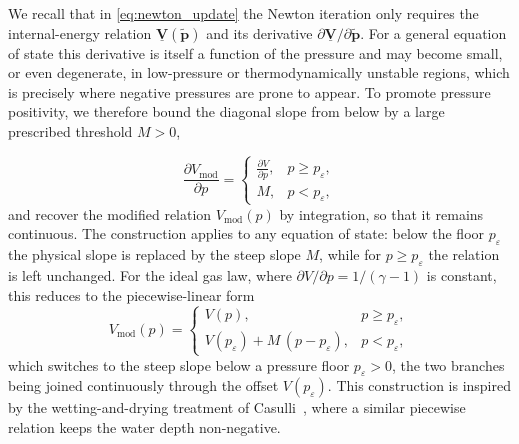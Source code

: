 \documentclass[a4paper,fleqn]{cas-sc}
\theoremstyle{definition}
\theoremstyle{remark}
\begin{document}
We recall that in \eqref{eq:newton_update} the Newton
iteration only requires the internal-energy relation
$\underline{\mathbf{V}}(\tilde{\mathbf{p}})$ and its derivative
$\partial\underline{\mathbf{V}}/\partial\tilde{\mathbf{p}}$. For a general equation of
state this derivative is itself a function of the pressure and may become small, or even
degenerate, in low-pressure or thermodynamically unstable regions, which is precisely
where negative pressures are prone to appear. To promote pressure positivity, we therefore bound
the diagonal slope from below by a large prescribed threshold $M>0$,


\begin{equation}
\label{eq:Vmod_slope}
\frac{\partial V_{\mathrm{mod}}}{\partial p}=
\begin{cases}
\frac{\partial V}{\partial p}, & p\ge p_{\varepsilon},\\[6pt]
M, & p<p_{\varepsilon},
\end{cases}
\end{equation}
and recover the modified relation $V_{\mathrm{mod}}(p)$ by integration, so that it
remains continuous. The construction applies to any equation of state: below the floor $p_{\varepsilon}$ the physical slope is replaced by the steep slope $M$, while for $p \geq p_\varepsilon$
the relation is left unchanged. For the ideal gas law, where $\partial V/\partial p=1/(\gamma-1)$ is constant, this reduces to the piecewise-linear
form
\begin{equation}
\label{eq:Vmod}
V_{\mathrm{mod}}(p)=
\begin{cases}
V(p), & p\ge p_{\varepsilon},\\[6pt]
V(p_{\varepsilon})+M\,(p-p_{\varepsilon}), & p<p_{\varepsilon},
\end{cases}
\end{equation}
which switches to the steep slope below a pressure floor $p_{\varepsilon}>0$, the two
branches being joined continuously through the offset $V(p_{\varepsilon})$. This
construction is inspired by the wetting-and-drying treatment of
Casulli~\cite{Casulli2009}, where a similar piecewise relation keeps the water
depth non-negative.
\end{document}
